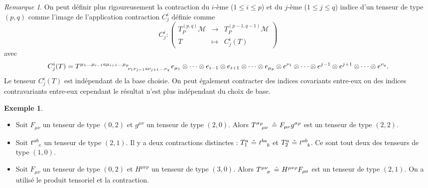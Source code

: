 \documentclass[a4paper,11pt]{report}
\theoremstyle{definition}
\theoremstyle{plain}
\theoremstyle{definition}
\newtheorem{exmp}{Exemple}[chapter]
\theoremstyle{remark}
\newtheorem{rmk}{Remarque}[chapter]
\newcommand{\M}{\mathscr{M}}
\begin{document}
                \begin{rmk}
                    On peut définir plus rigoureusement la contraction du $i$-ème ($1\leq i\leq p$) et du $j$-ème ($1\leq j\leq q$) indice d'un tenseur de type $(p,q)$ comme l'image de l'application contraction $C^i_j$ définie comme
                    \begin{equation}
                        C^i_j:\left(
                    \begin{array}{ccc}
                        T^{(p,q)}_P\M & \longrightarrow & T^{(p-1,q-1)}_P\M \\
                        T & \longmapsto & C^i_j(T)
                    \end{array}
                    \right)
                    \end{equation}
                    avec 
                    \begin{equation}
                        C^i_j(T) = T\indices{^{\mu_1\dots\mu_{i-1}a\mu_{i+1}\dots\mu_p}_{\nu_1\nu_{j-1}a\nu_{j+1}\dots\nu_q}} e_{\mu_1}\otimes\dots\otimes e_{i-1}\otimes  e_{i+1}\otimes\dots\otimes e_{\mu_p}\otimes e^{\nu_1}\otimes\dots\otimes e^{j-1}\otimes e^{j+1}\otimes\dots\otimes e^{\nu_q}.
                    \end{equation}
                    Le tenseur $C^i_j(T)$ est indépendant de la base choisie. On peut également contracter des indices covariants entre-eux ou des indices contravariants entre-eux cependant le résultat n'est plus indépendant du choix de base.
                \end{rmk}
                
                \begin{exmp}${}$
                    \begin{itemize}[label = \textbullet]
                        \item Soit $F_{\mu\nu}$ un tenseur de type $(0,2)$ et $g^{\mu\nu}$ un tenseur de type $(2,0)$. Alors $T\indices{^\sigma^\rho_\mu_\nu}~\hat{=}~F_{\mu\nu}g^{\sigma\rho}$ est un tenseur de type $(2,2)$.
                        \item Soit $t\indices{^a^b_c}$ un tenseur de type $(2,1)$. Il y a deux contractions distinctes : $T_1^a~\hat{=}~t\indices{^b^a_b}$ et $T_2^a~\hat{=}~t\indices{^a^b_b}$. Ce sont tout deux des tenseurs de type $(1,0)$.
                        \item Soit $F_{\mu\nu}$ un tenseur de type $(0,2)$ et $H^{\mu\nu\rho}$ un tenseur de type $(3,0)$. Alors $T\indices{^\mu^\nu_\sigma}~\hat{=}~H^{\mu\nu\rho}F_{\rho\sigma}$ est un tenseur de type $(2,1)$. On a utilisé le produit tensoriel et la contraction.
                    \end{itemize}
                \end{exmp}
                
\end{document}
